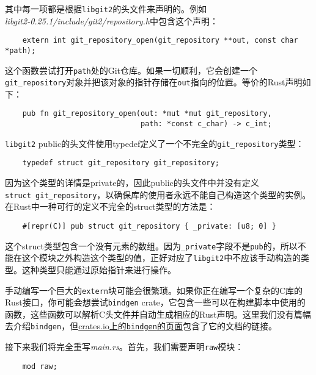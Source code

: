 其中每一项都是根据\texttt{libgit2}的头文件来声明的。例如\\
\emph{libgit2-0.25.1/include/git2/repository.h}中包含这个声明：
\begin{verbatim}
    extern int git_repository_open(git_repository **out, const char *path);
\end{verbatim}

这个函数尝试打开\texttt{path}处的Git仓库。如果一切顺利，它会创建一个\texttt{git\_repository}对象并把该对象的指针存储在\texttt{out}指向的位置。等价的Rust声明如下：
\begin{verbatim}
    pub fn git_repository_open(out: *mut *mut git_repository,
                               path: *const c_char) -> c_int;
\end{verbatim}

\texttt{libgit2} public的头文件使用typedef定义了一个不完全的\texttt{git\_repository}类型：
\begin{verbatim}
    typedef struct git_repository git_repository;
\end{verbatim}

因为这个类型的详情是private的，因此public的头文件中并没有定义\\
\texttt{struct git\_repository}，以确保库的使用者永远不能自己构造这个类型的实例。在Rust中一种可行的定义不完全的struct类型的方法是：
\begin{verbatim}
    #[repr(C)] pub struct git_repository { _private: [u8; 0] }
\end{verbatim}

这个struct类型包含一个没有元素的数组。因为\texttt{\_private}字段不是\texttt{pub}的，所以不能在这个模块之外构造这个类型的值，正好对应了\texttt{libgit2}中不应该手动构造的类型。这种类型只能通过原始指针来进行操作。

手动编写一个巨大的\texttt{extern}块可能会很繁琐。如果你正在编写一个复杂的C库的Rust接口，你可能会想尝试\texttt{bindgen} crate，它包含一些可以在构建脚本中使用的函数，这些函数可以解析C头文件并自动生成相应的Rust声明。这里我们没有篇幅去介绍\texttt{bindgen}，但\href{https://crates.io/crates/bindgen}{crates.io上的\texttt{bindgen}的页面}包含了它的文档的链接。

接下来我们将完全重写\emph{main.rs}。首先，我们需要声明\texttt{raw}模块：
\begin{verbatim}
    mod raw;
\end{verbatim}

